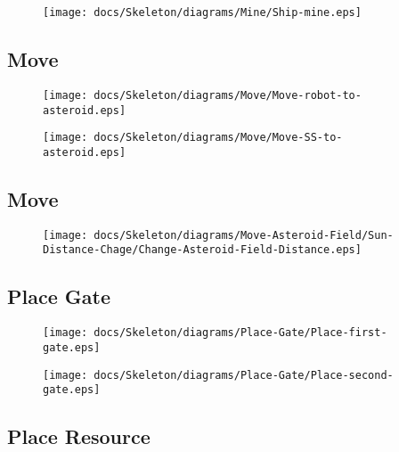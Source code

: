 \begin{figure}[H] 
    \centering 
    \texttt{[image: docs/Skeleton/diagrams/Mine/Ship-mine.eps]} 
    \caption{} 
\end{figure} 

\subsection{Move}

\begin{figure}[H] 
    \centering 
    \texttt{[image: docs/Skeleton/diagrams/Move/Move-robot-to-asteroid.eps]} 
    \caption{} 
\end{figure} 

\begin{figure}[H] 
    \centering 
    \texttt{[image: docs/Skeleton/diagrams/Move/Move-SS-to-asteroid.eps]} 
    \caption{} 
\end{figure} 

\subsection{Move}

\begin{figure}[H] 
    \centering 
    \texttt{[image: docs/Skeleton/diagrams/Move-Asteroid-Field/Sun-Distance-Chage/Change-Asteroid-Field-Distance.eps]} 
    \caption{} 
\end{figure} 

\subsection{Place Gate}

\begin{figure}[H] 
    \centering 
    \texttt{[image: docs/Skeleton/diagrams/Place-Gate/Place-first-gate.eps]} 
    \caption{} 
\end{figure} 

\begin{figure}[H] 
    \centering 
    \texttt{[image: docs/Skeleton/diagrams/Place-Gate/Place-second-gate.eps]} 
    \caption{} 
\end{figure} 


\subsection{Place Resource}

